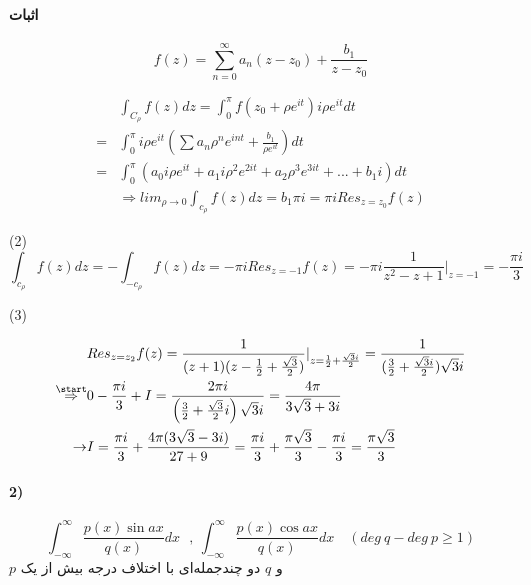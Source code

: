 \paragraph{اثبات}
\begin{equation*}
f(z) = \sum_{n=0}^{\infty} a_{n} (z-z_{0} ) + \frac {b_{1}}{z-z_{0}}
\end{equation*}
\begin{center}
\begin{align*}
&\int_{C_{\rho}} f(z) d z=\int_{0}^{\pi} f\left(z_{0}+\rho e^{i t}\right)i \rho e^{i t} d t
\\
=&\int_{0}^{\pi} i \rho e^{i t}\left(\sum a_{n} \rho^{n} e^{i n t}+\frac{b_{1}}{\rho e^{ i t}}\right) d t
\\
=&\int_{0}^{\pi} ( a_{0}i \rho e^{i  t} + a_{1}i \rho^{2} e^{2i  t} + a_{2} \rho^{3} e^{3i  t} + ... + b_{1} i )dt
\\
&\Rightarrow lim_{\rho \rightarrow 0} \int_{c_{\rho}} f(z)dz = b_{1}\pi i = \pi i Res_{z=z_{0}} f(z)
\end{align*}
\end{center}
\par{(2)}
\begin{equation*}
\int_{c_{\rho}} f(z)dz =-\int_{- c_{\rho}} f(z)dz=- \pi i Res_{z=-1} f(z)=- \pi i \frac {1}{z^{2}-z+1} |_{z=-1}=-\frac {\pi i}{3}
\end{equation*}
\par{(3)}
\begin{center}
\begin{align*}
 & Res_{ z=z_{2}}f(z) =\frac{1}{(z+1)(z-\frac{1}{2}+\frac { \sqrt{3} }{2})} |_{z=\frac{1}{2}+\frac { \sqrt{3} i}{2}}
=\frac {1}{(\frac{3}{2}+\frac { \sqrt{3} i}{2} )\sqrt{3} i}
\\
\overset{\start}{\Rightarrow}
 & 0-\frac{\pi i}{3}+I=\frac{2 \pi i}{\left(\frac{3}{2}+\frac{\sqrt{3}}{2} i\right) \sqrt{3} i}=\frac{4 \pi}{3 \sqrt{3}+3 i}
\\
\rightarrow & I=\frac{\pi i}{3}+\frac{4 \pi(3 \sqrt{3}-3 i)}{27+9}=\frac{\pi i}{3}+\frac{\pi \sqrt{3}}{3}-\frac{\pi i}{3}=\frac{\pi \sqrt{3}}{3}
\end{align*}
\end{center}
\newpage
\paragraph{2)}
\begin{equation*}
	\int_{-\infty}^{\infty} \frac {p(x) \sin ax }{q(x)} dx  \ \ \ , \ \int_{-\infty}^{\infty} \frac {p(x) \cos ax }{q(x)} dx \quad
(deg\ q - deg\ p \geq 1)
\end{equation*}
$p$ 
و 
$q$ 
دو چندجمله‌ای با اختلاف درجه بیش از یک

